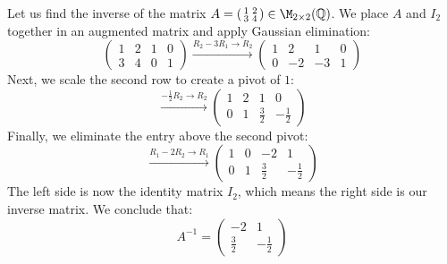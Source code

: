 \begin{example}
Let us find the inverse of the matrix $A = \left(\begin{smallmatrix} 1 & 2 \\ 3 & 4 \end{smallmatrix}\right) \in \M_{2 \times 2}(\mathbb{Q})$. We place $A$ and $I_2$ together in an augmented matrix and apply Gaussian elimination:
\begin{equation*}
    \left( \begin{array}{cc|cc} 1 & 2 & 1 & 0 \\ 3 & 4 & 0 & 1 \end{array} \right) \xrightarrow{R_2 - 3R_1 \longrightarrow R_2} \left( \begin{array}{cc|cc} 1 & 2 & 1 & 0 \\ 0 & -2 & -3 & 1 \end{array} \right)
\end{equation*}
Next, we scale the second row to create a pivot of $1$:
\begin{equation*}
    \xrightarrow{-\frac{1}{2}R_2 \longrightarrow R_2} \left( \begin{array}{cc|cc} 1 & 2 & 1 & 0 \\ 0 & 1 & \frac{3}{2} & -\frac{1}{2} \end{array} \right)
\end{equation*}
Finally, we eliminate the entry above the second pivot:
\begin{equation*}
    \xrightarrow{R_1 - 2R_2 \longrightarrow R_1} \left( \begin{array}{cc|cc} 1 & 0 & -2 & 1 \\ 0 & 1 & \frac{3}{2} & -\frac{1}{2} \end{array} \right)
\end{equation*}
The left side is now the identity matrix $I_2$, which means the right side is our inverse matrix. We conclude that:
\begin{equation*}
    A^{-1} = \begin{pmatrix} -2 & 1 \\ \frac{3}{2} & -\frac{1}{2} \end{pmatrix}
\end{equation*}
\end{example}

